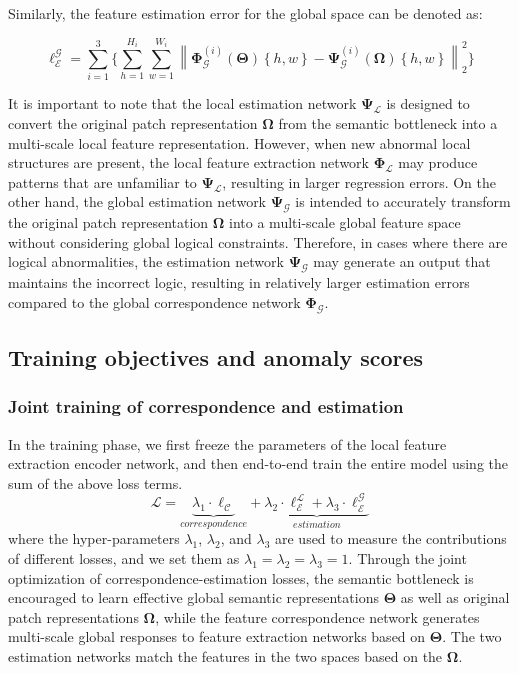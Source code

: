 \documentclass[lettersize,journal]{IEEEtran}
\begin{document}
Similarly, the feature estimation error for the global space can be denoted as:

\begin{equation}
\ell_{\mathcal{E}}^{\mathcal{G}}= \sum_{i=1}^{3}\Big\{   \sum_{h=1}^{H_{i}}  \sum_{w=1}^{W_{i}} \left \|  \mathbf{\Phi}_{\mathcal{G}}^{(i)}(\mathbf{\Theta})\left \{ h,w \right \}-\mathbf{\Psi }_{\mathcal{G}}^{(i)}(\mathbf{\Omega})\left \{ h,w \right \} \right \|_{2}^{2} \Big\}
\end{equation}

It is important to note that the local estimation network $\mathbf{\Psi}_{\mathcal{L}}$ is designed to convert the original patch representation $\mathbf{\Omega}$ from the semantic bottleneck into a multi-scale local feature representation. However, when new abnormal local structures are present, the local feature extraction network $\mathbf{\Phi}_{\mathcal{L}}$ may produce patterns that are unfamiliar to $\mathbf{\Psi}_{\mathcal{L}}$, resulting in larger regression errors. On the other hand, the global estimation network $\mathbf{\Psi}_{\mathcal{G}}$ is intended to accurately transform the original patch representation $\mathbf{\Omega}$ into a multi-scale global feature space without considering global logical constraints. Therefore, in cases where there are logical abnormalities, the estimation network $\mathbf{\Psi}_{\mathcal{G}}$ may generate an output that maintains the incorrect logic, resulting in relatively larger estimation errors compared to the global correspondence network $\mathbf{\Phi_{\mathcal{G}}}$.

\subsection{Training objectives and anomaly scores}

\subsubsection{Joint training of correspondence and estimation}
In the training phase, we first freeze the parameters of the local feature extraction encoder network, and then end-to-end train the entire model using the sum of the above loss terms.
\begin{equation}
\mathcal{L} =\underbrace{\lambda_{1}\cdot \ell_{\mathcal{C}}}_{correspondence}+ \underbrace{\lambda_{2} \cdot\ell_{\mathcal{E}}^{\mathcal{L}}+\lambda_{3}\cdot \ell_{\mathcal{E}}^{\mathcal{G}}}_{estimation}
\end{equation}
where the hyper-parameters $\lambda_{1}$, $\lambda_{2}$, and $\lambda_{3}$ are used to measure the contributions of different losses, and we set them as $\lambda_{1}=\lambda_{2}=\lambda_{3}=1$. Through the joint optimization of correspondence-estimation losses, the semantic bottleneck is encouraged to learn effective global semantic representations $\mathbf{\Theta}$ as well as original patch representations $\mathbf{\Omega}$, while the feature correspondence network generates multi-scale global responses to feature extraction networks based on $\mathbf{\Theta}$. The two estimation networks match the features in the two spaces based on the $\mathbf{\Omega}$.
\end{document}
